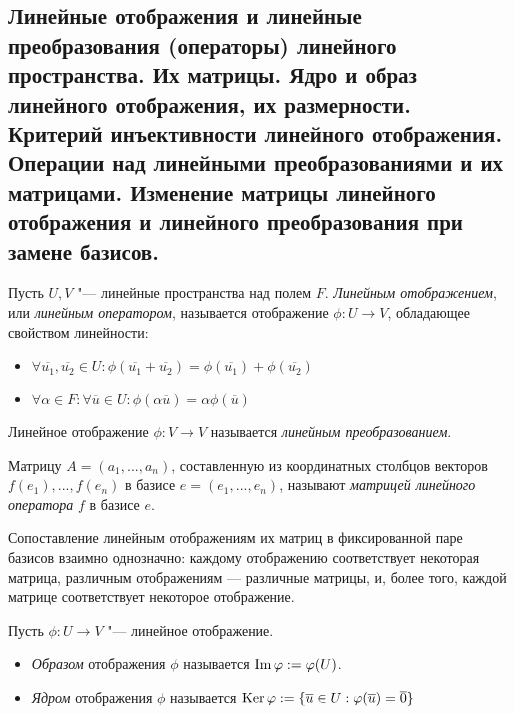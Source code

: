 \subsection{Линейные отображения и линейные преобразования (операторы) линейного пространства. Их матрицы. Ядро и образ линейного отображения, их размерности. Критерий инъективности линейного отображения. Операции над линейными преобразованиями и их матрицами. Изменение матрицы линейного отображения и линейного преобразования при замене базисов.}
    
    \begin{definition}
    	Пусть $U, V$ "--- линейные пространства над полем $F$. \textit{Линейным отображением}, или \textit{линейным оператором}, называется отображение $\phi: U \rightarrow V$, обладающее свойством линейности:
    	\begin{itemize}
    		\item $\forall \overline{u_1}, \overline{u_2} \in U: \phi(\overline{u_1} + \overline{u_2}) = \phi(\overline{u_1}) + \phi(\overline{u_2})$
    		\item $\forall \alpha \in F: \forall \overline{u} \in U: \phi(\alpha\overline{u}) = \alpha\phi(\overline{u})$
    	\end{itemize}
    
    	Линейное отображение $\phi: V \rightarrow V$ называется \textit{линейным преобразованием}.
    \end{definition}
    
    \begin{definition}
        Матрицу $A = (a_{1}, ..., a_{n})$, составленную из координатных столбцов векторов $f(e_{1}), ..., f(e_{n})$ в базисе $e = (e_{1}, ..., e_{n})$, называют \textit{матрицей линейного оператора} $f$ в базисе $e$.
    \end{definition}
    
    \begin{note}
    	Сопоставление линейным отображениям их матриц в фиксированной паре базисов взаимно однозначно: каждому отображению соответствует некоторая матрица, различным отображениям --- различные матрицы, и, более того, каждой матрице соответствует некоторое отображение.
    \end{note}
    
    \begin{definition}
    	Пусть $\phi: U \rightarrow V$ "--- линейное отображение.
    	\begin{itemize}
    		\item \textit{Образом} отображения $\phi$ называется $\operatorname{Im}{\varphi} := \varphi(U)$.
    		\item \textit{Ядром} отображения $\phi$ называется $\operatorname{Ker}{\varphi} := \{\overline{u} \in U: \varphi(\overline{u})  = \overline{0}\}$
    	\end{itemize}
    \end{definition}
    
